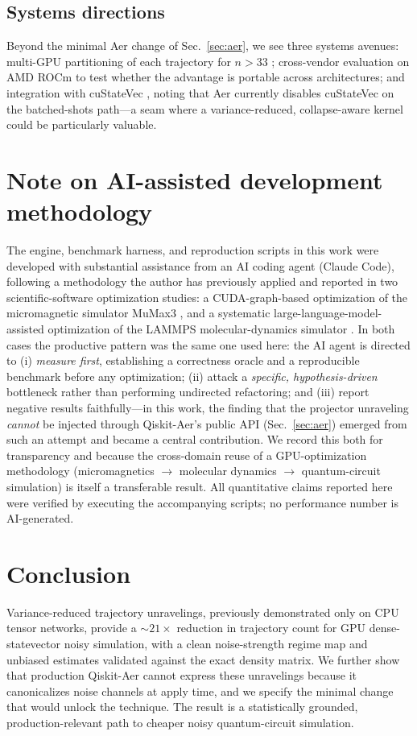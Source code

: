 \documentclass{ieeeaccess}
\begin{document}
\subsection{Systems directions}
Beyond the minimal Aer change of Sec.~\ref{sec:aer}, we see three systems avenues: multi-GPU partitioning
of each trajectory for $n>33$ \cite{atlas_sc24,questab_ics25,multigpu_network2025}; cross-vendor
evaluation on AMD ROCm \cite{rocm_qiskit2024} to test whether the advantage is portable across
architectures; and integration with cuStateVec \cite{cuquantum2023}, noting that Aer currently disables
cuStateVec on the batched-shots path---a seam where a variance-reduced, collapse-aware kernel could be
particularly valuable.

\section{Note on AI-assisted development methodology}\label{sec:ai}
The engine, benchmark harness, and reproduction scripts in this work were developed with substantial
assistance from an AI coding agent (Claude Code), following a methodology the author has previously
applied and reported in two scientific-software optimization studies: a CUDA-graph-based optimization of
the micromagnetic simulator MuMax3 \cite{you2026mumax}, and a systematic large-language-model-assisted
optimization of the LAMMPS molecular-dynamics simulator \cite{you2026lammps}. In both cases the
productive pattern was the same one used here: the AI agent is directed to (i) \emph{measure first},
establishing a correctness oracle and a reproducible benchmark before any optimization; (ii) attack a
\emph{specific, hypothesis-driven} bottleneck rather than performing undirected refactoring; and
(iii) report negative results faithfully---in this work, the finding that the projector unraveling
\emph{cannot} be injected through Qiskit-Aer's public API (Sec.~\ref{sec:aer}) emerged from such an
attempt and became a central contribution. We record this both for transparency and because the
cross-domain reuse of a GPU-optimization methodology (micromagnetics $\rightarrow$ molecular dynamics
$\rightarrow$ quantum-circuit simulation) is itself a transferable result. All quantitative claims
reported here were verified by executing the accompanying scripts; no performance number is
AI-generated.

\section{Conclusion}
Variance-reduced trajectory unravelings, previously demonstrated only on CPU tensor networks,
provide a $\sim\!21\times$ reduction in trajectory count for GPU dense-statevector noisy
simulation, with a clean noise-strength regime map and unbiased estimates validated against the
exact density matrix. We further show that production Qiskit-Aer cannot express these unravelings
because it canonicalizes noise channels at apply time, and we specify the minimal change that
would unlock the technique. The result is a statistically grounded, production-relevant path to
cheaper noisy quantum-circuit simulation.
\end{document}
